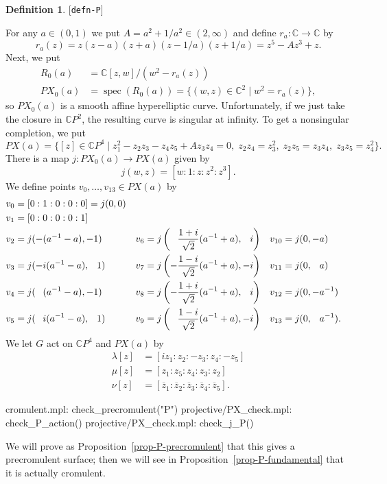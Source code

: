 \documentclass[reqno]{amsart}
\newcommand{\lbl}[1]{\label{#1}\textup{[\texttt{#1}]}\par}
\newcommand{\lbl}{\label}
\newcommand{\spec}	{\operatorname{spec}}
\newcommand{\lm}        {\lambda}
\newcommand{\C}         {{\mathbb{C}}}
\newcommand{\ov}[1]     {\overline{#1}}
\newcommand{\st}        {\;|\;}
\newcommand{\rt}        {\sqrt{2}}
\newcommand{\pp}        {\hphantom{+}}
\renewcommand{\:}{\colon}
\theoremstyle{definition}
\newtheorem{definition}[theorem]{Definition}
\begin{document}
\begin{definition}\lbl{defn-P}
 For any $a\in(0,1)$ we put $A=a^2+1/a^2\in(2,\infty)$ and define
 $r_a\:\C\to\C$ by
 \[ r_a(z) = z(z-a)(z+a)(z-1/a)(z+1/a)
           = z^5 - A z^3 + z.
 \]
 Next, we put
 \begin{align*}
  R_0(a) &= \C[z,w]/(w^2-r_a(z)) \\
  PX_0(a) &= \spec(R_0(a)) = \{(w,z)\in \C^2 \st w^2=r_a(z) \},
 \end{align*}
 so $PX_0(a)$ is a smooth affine hyperelliptic curve.  Unfortunately,
 if we just take the closure in $\C P^2$, the resulting curve is
 singular at infinity.  To get a nonsingular completion, we put
 \[ PX(a) = \{[z]\in\C P^4\st
              z_1^2-z_2z_3-z_4z_5+Az_3z_4=0,\;
              z_2z_4=z_3^2,\;z_2z_5=z_3z_4,\;z_3z_5=z_4^2
            \}.
 \]
 There is a map $j\:PX_0(a)\to PX(a)$ given by
 \[ j(w,z) = [w:1:z:z^2:z^3]. \]
 We define points $v_0,\dotsc,v_{13}\in PX(a)$ by
 \begin{align*}
  v_0 &= [0:1:0:0:0] = j(0,0) \\
  v_1 &= [0:0:0:0:1] \\
  v_2 &= j( -(a^{-1}-a),-1) &
  v_6 &= j\left(\pp \frac{1+i}{\rt}(a^{-1}+a),\pp i\right) &
  v_{10} &= j(0,-a) \\
  v_3 &= j(-i(a^{-1}-a),\pp 1) &
  v_7 &= j\left(-\frac{1-i}{\rt}(a^{-1}+a),-i\right) &
  v_{11} &= j(0,\pp a) \\
  v_4 &= j(\pp (a^{-1}-a),-1) &
  v_8 &= j\left(-\frac{1+i}{\rt}(a^{-1}+a),\pp i\right) &
  v_{12} &= j(0,-a^{-1}) \\
  v_5 &= j(\pp i(a^{-1}-a),\pp 1) &
  v_9 &= j\left(\pp \frac{1-i}{\rt}(a^{-1}+a),-i\right) &
  v_{13} &= j(0,\pp a^{-1}).
 \end{align*}
 We let $G$ act on $\C P^4$ and $PX(a)$ by
 \begin{align*}
  \lm[z] &= [iz_1:z_2:-z_3:z_4:-z_5] \\
  \mu[z] &= [z_1:z_5:z_4:z_3:z_2] \\
  \nu[z] &= [\ov{z}_1:\ov{z}_2:\ov{z}_3:\ov{z}_4:\ov{z}_5].
 \end{align*}
\end{definition}
\begin{checks}
 cromulent.mpl: check_precromulent("P")
 projective/PX_check.mpl: check_P_action()
 projective/PX_check.mpl: check_j_P()
\end{checks}
We will prove as Proposition~\ref{prop-P-precromulent} that this
gives a precromulent surface; then we will see in
Proposition~\ref{prop-P-fundamental} that it is actually cromulent.
\end{document}
